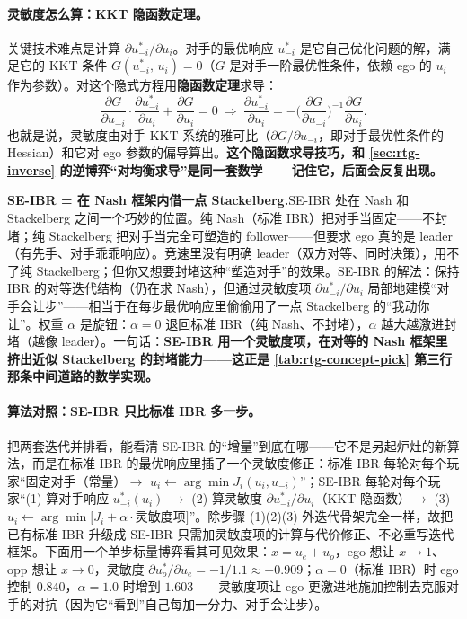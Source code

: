 \paragraph{灵敏度怎么算：KKT 隐函数定理。}
关键技术难点是计算 $\partial u_{-i}^*/\partial u_i$。对手的最优响应 $u_{-i}^*$ 是它自己优化问题的解，满足它的 KKT 条件 $G(u_{-i}^*,\,u_i)=0$（$G$ 是对手一阶最优性条件，依赖 ego 的 $u_i$ 作为参数）。对这个隐式方程用\textbf{隐函数定理}求导：
\begin{equation}
  \frac{\partial G}{\partial u_{-i}}\cdot\frac{\partial u_{-i}^*}{\partial u_i}+\frac{\partial G}{\partial u_i}=0
  \ \Longrightarrow\
  \frac{\partial u_{-i}^*}{\partial u_i}=-\Big(\frac{\partial G}{\partial u_{-i}}\Big)^{-1}\frac{\partial G}{\partial u_i}.
  \label{eq:rtg-seibr-sensitivity}
\end{equation}
也就是说，灵敏度由对手 KKT 系统的雅可比（$\partial G/\partial u_{-i}$，即对手最优性条件的 Hessian）和它对 ego 参数的偏导算出。\textbf{这个隐函数求导技巧，和 \cref{sec:rtg-inverse} 的逆博弈“对均衡求导”是同一套数学——记住它，后面会反复出现。}

\begin{insight}
\textbf{SE-IBR = 在 Nash 框架内借一点 Stackelberg.}\;SE-IBR 处在 Nash 和 Stackelberg 之间一个巧妙的位置。纯 Nash（标准 IBR）把对手当固定——不封堵；纯 Stackelberg 把对手当完全可塑造的 follower——但要求 ego 真的是 leader（有先手、对手乖乖响应）。竞速里没有明确 leader（双方对等、同时决策），用不了纯 Stackelberg；但你又想要封堵这种“塑造对手”的效果。SE-IBR 的解法：保持 IBR 的对等迭代结构（仍在求 Nash），但通过灵敏度项 $\partial u_{-i}^*/\partial u_i$ 局部地建模“对手会让步”——相当于在每步最优响应里偷偷用了一点 Stackelberg 的“我动你让”。权重 $\alpha$ 是旋钮：$\alpha=0$ 退回标准 IBR（纯 Nash、不封堵），$\alpha$ 越大越激进封堵（越像 leader）。一句话：\textbf{SE-IBR 用一个灵敏度项，在对等的 Nash 框架里挤出近似 Stackelberg 的封堵能力——这正是 \cref{tab:rtg-concept-pick} 第三行那条中间道路的数学实现。}
\end{insight}

\paragraph{算法对照：SE-IBR 只比标准 IBR 多一步。}
把两套迭代并排看，能看清 SE-IBR 的“增量”到底在哪——它不是另起炉灶的新算法，而是在标准 IBR 的最优响应里插了一个灵敏度修正：标准 IBR 每轮对每个玩家“固定对手（常量）$\to$ $u_i\leftarrow\arg\min J_i(u_i,u_{-i})$”；SE-IBR 每轮对每个玩家“(1) 算对手响应 $u_{-i}^*(u_i)$ $\to$ (2) 算灵敏度 $\partial u_{-i}^*/\partial u_i$（KKT 隐函数）$\to$ (3) $u_i\leftarrow\arg\min[J_i+\alpha\cdot$灵敏度项$]$”。除步骤 (1)(2)(3) 外迭代骨架完全一样，故把已有标准 IBR 升级成 SE-IBR 只需加灵敏度项的计算与代价修正、不必重写迭代框架。下面用一个单步标量博弈看其可见效果：$x=u_e+u_o$，ego 想让 $x\to1$、opp 想让 $x\to0$，灵敏度 $\partial u_o^*/\partial u_e=-1/1.1\approx-0.909$；$\alpha=0$（标准 IBR）时 ego 控制 $0.840$，$\alpha=1.0$ 时增到 $1.603$——灵敏度项让 ego 更激进地施加控制去克服对手的对抗（因为它“看到”自己每加一分力、对手会让步）\cite{spica2020realtime}。


